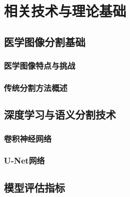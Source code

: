 \section{相关技术与理论基础}

\subsection{医学图像分割基础}

\subsubsection{医学图像特点与挑战}


\subsubsection{传统分割方法概述}

\subsection{深度学习与语义分割技术}

\subsubsection{卷积神经网络}

\subsubsection{U-Net网络}


\subsection{模型评估指标}
